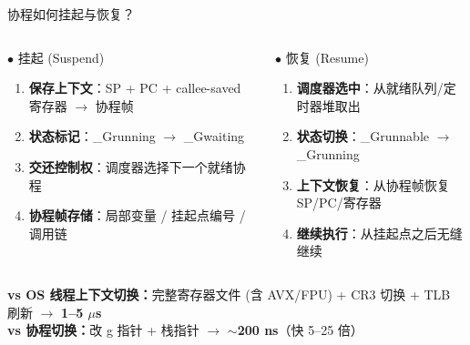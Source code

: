 \begin{frame}{协程如何挂起与恢复？}
  \begin{columns}[T]
    \begin{block}{\textcolor{midblue}{$\bullet$} 挂起 (Suspend)}
      \begin{enumerate}
        \item \textbf{保存上下文}：SP + PC + callee-saved 寄存器 $\rightarrow$ 协程帧
        \item \textbf{状态标记}：\_Grunning $\rightarrow$ \_Gwaiting
        \item \textbf{交还控制权}：调度器选择下一个就绪协程
        \item \textbf{协程帧存储}：局部变量 / 挂起点编号 / 调用链
      \end{enumerate}
    \end{block}

    \begin{exampleblock}{\textcolor{corGreen}{$\bullet$} 恢复 (Resume)}
      \begin{enumerate}
        \item \textbf{调度器选中}：从就绪队列/定时器堆取出
        \item \textbf{状态切换}：\_Grunnable $\rightarrow$ \_Grunning
        \item \textbf{上下文恢复}：从协程帧恢复 SP/PC/寄存器
        \item \textbf{继续执行}：从挂起点之后无缝继续
      \end{enumerate}
    \end{exampleblock}
  \end{columns}

  \vspace{0.6em}

  \begin{center}
    \textcolor{corRed}{\textbf{vs OS 线程上下文切换：}}完整寄存器文件 (含 AVX/FPU) + CR3 切换 + TLB 刷新 $\rightarrow$ \textbf{1--5 $\mu$s} \\
    \textcolor{corGreen}{\textbf{vs 协程切换：}}改 g 指针 + 栈指针 $\rightarrow$ \textbf{$\sim$200 ns}（快 5--25 倍）
  \end{center}
\end{frame}

